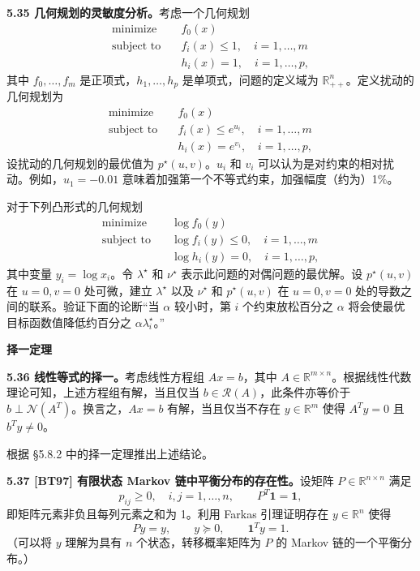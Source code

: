\documentclass[UTF8,12pt,a4paper,fontset=fandol]{ctexart}
\begin{document}
\noindent\textbf{5.35 几何规划的灵敏度分析。}\quad 考虑一个几何规划
\[
\begin{aligned}
\text{minimize}\quad & f_0(x)\\
\text{subject to}\quad & f_i(x)\leq 1,\quad i=1,\ldots,m\\
& h_i(x)=1,\quad i=1,\ldots,p,
\end{aligned}
\]
其中 $f_0,\ldots,f_m$ 是正项式，$h_1,\ldots,h_p$ 是单项式，问题的定义域为 $\mathbb{R}_{++}^n$。定义扰动的几何规划为
\[
\begin{aligned}
\text{minimize}\quad & f_0(x)\\
\text{subject to}\quad & f_i(x)\leq e^{u_i},\quad i=1,\ldots,m\\
& h_i(x)=e^{v_i},\quad i=1,\ldots,p,
\end{aligned}
\]
设扰动的几何规划的最优值为 $p^\star(u,v)$。$u_i$ 和 $v_i$ 可以认为是对约束的相对扰动。例如，$u_1=-0.01$ 意味着加强第一个不等式约束，加强幅度（约为）1\%。

对于下列凸形式的几何规划
\[
\begin{aligned}
\text{minimize}\quad & \log f_0(y)\\
\text{subject to}\quad & \log f_i(y)\leq 0,\quad i=1,\ldots,m\\
& \log h_i(y)=0,\quad i=1,\ldots,p,
\end{aligned}
\]
其中变量 $y_i=\log x_i$。令 $\lambda^\star$ 和 $\nu^\star$ 表示此问题的对偶问题的最优解。设 $p^\star(u,v)$ 在 $u=0, v=0$ 处可微，建立 $\lambda^\star$ 以及 $\nu^\star$ 和 $p^\star(u,v)$ 在 $u=0, v=0$ 处的导数之间的联系。验证下面的论断“当 $\alpha$ 较小时，第 $i$ 个约束放松百分之 $\alpha$ 将会使最优目标函数值降低约百分之 $\alpha\lambda_i^\star$。”

\noindent\textbf{择一定理}

\noindent\textbf{5.36 线性等式的择一。}\quad 考虑线性方程组 $Ax=b$，其中 $A\in\mathbb{R}^{m\times n}$。根据线性代数理论可知，上述方程组有解，当且仅当 $b\in\mathcal{R}(A)$，此条件亦等价于 $b\perp\mathcal{N}(A^T)$。换言之，$Ax=b$ 有解，当且仅当不存在 $y\in\mathbb{R}^m$ 使得 $A^Ty=0$ 且 $b^Ty\neq 0$。

根据 §5.8.2 中的择一定理推出上述结论。

\noindent\textbf{5.37 [BT97] 有限状态 Markov 链中平衡分布的存在性。}\quad 设矩阵 $P\in\mathbb{R}^{n\times n}$ 满足
\[
p_{ij}\geq 0,\quad i,j=1,\ldots,n,\qquad P^T\mathbf{1}=\mathbf{1},
\]
即矩阵元素非负且每列元素之和为 1。利用 Farkas 引理证明存在 $y\in\mathbb{R}^n$ 使得
\[
Py=y,\qquad y\succeq 0,\qquad \mathbf{1}^Ty=1.
\]
（可以将 $y$ 理解为具有 $n$ 个状态，转移概率矩阵为 $P$ 的 Markov 链的一个平衡分布。）
\end{document}
